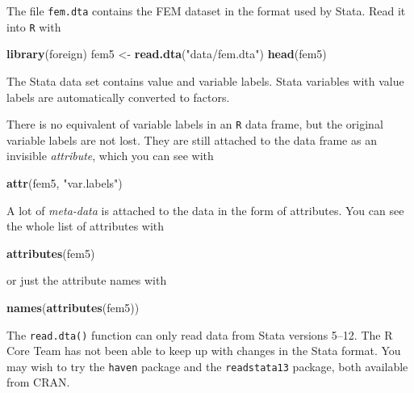 \documentclass[
]{book}
\newenvironment{Shaded}{\begin{snugshade}}{\end{snugshade}}
\newcommand{\FunctionTok}[1]{\textcolor[rgb]{0.13,0.29,0.53}{\textbf{#1}}}
\newcommand{\NormalTok}[1]{#1}
\newcommand{\OtherTok}[1]{\textcolor[rgb]{0.56,0.35,0.01}{#1}}
\newcommand{\StringTok}[1]{\textcolor[rgb]{0.31,0.60,0.02}{#1}}
\begin{document}
The file \texttt{fem.dta} contains the FEM dataset in the format
used by Stata. Read it into \texttt{R} with

\begin{Shaded}
\begin{Highlighting}[]
\FunctionTok{library}\NormalTok{(foreign)}
\NormalTok{fem5 }\OtherTok{\textless{}{-}} \FunctionTok{read.dta}\NormalTok{(}\StringTok{"data/fem.dta"}\NormalTok{)}
\FunctionTok{head}\NormalTok{(fem5)}
\end{Highlighting}
\end{Shaded}

The Stata data set contains value and variable labels.
Stata variables with value labels are automatically converted to
factors.

There is no equivalent of variable labels in an \texttt{R} data frame,
but the original variable labels are not lost. They are still attached
to the data frame as an invisible \emph{attribute}, which you can see
with

\begin{Shaded}
\begin{Highlighting}[]
\FunctionTok{attr}\NormalTok{(fem5, }\StringTok{"var.labels"}\NormalTok{)}
\end{Highlighting}
\end{Shaded}

A lot of \emph{meta-data} is attached to the data in the form of
attributes. You can see the whole list of attributes with

\begin{Shaded}
\begin{Highlighting}[]
\FunctionTok{attributes}\NormalTok{(fem5)}
\end{Highlighting}
\end{Shaded}

or just the attribute names with

\begin{Shaded}
\begin{Highlighting}[]
\FunctionTok{names}\NormalTok{(}\FunctionTok{attributes}\NormalTok{(fem5))}
\end{Highlighting}
\end{Shaded}

The \texttt{read.dta()} function can only read data from Stata
versions 5--12. The R Core Team has not been able to keep up with
changes in the Stata format. You may wish to try the \texttt{haven}
package and the \texttt{readstata13} package, both available from
CRAN.
\end{document}
